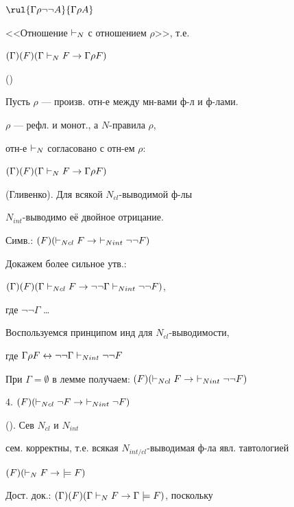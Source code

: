 \hspace*{5mm}$\rul{\Gamma\rr\neg\neg A}{\Gamma\rr A}$\ \par\vspace{3mm}
\par
<<Отношение $\vdash_{N}$  с отношением $\rho$>>, т.е.\par
\hspace*{20mm}$(\Gamma)(F)(\Gamma\vdash_{N} F\to\Gamma\rho F)$\par
{} ()\par
Пусть $\rho$ --- произв. отн-е между мн-вами ф-л и ф-лами.\par
{} $\rho$ --- рефл. и монот., а  $N$-правила  $\rho$,\par
{} отн-е $\vdash_{N}$ согласовано с отн-ем $\rho$:\par
\hspace*{20mm}$(\Gamma)(F)(\Gamma\vdash_{N} F\to\Gamma\rho F)$\par
{} (Гливенко). Для всякой $N_{cl}$-выводимой ф-лы\par
$N_{int}$-выводимо её двойное отрицание.\par
Симв.: \hspace{10mm}$(F)(\ncl F\to\ \nint\neg\neg F)$\par
Докажем более сильное утв.:\par
{} $(\Gamma)(F)(\Gamma\vdash_{Ncl} F\to\neg\neg\Gamma\vdash_{Nint}\neg\neg F)$,\par
где $\neg\neg\Gamma$ \dots\par
Воспользуемся принципом инд для $N_{cl}$-выводимости,\par
где $\Gamma\rho F\leftrightarrow\neg\neg\Gamma\vdash_{Nint}\neg\neg F$\par
\dvo При $\Gamma=\emptyset$ в лемме получаем: $(F)(\ncl F\to\ \nint\neg\neg F)$\par
4.  $(F)(\vdash_{Ncl}\neg F\to\ \vdash_{Nint}\neg F)$\par
{}\par
{} (). Сев $N_{cl}$ и $N_{int}$\par
сем. корректны, т.е. всякая $N_{int/cl}$-выводимая ф-ла явл. тавтологией\par
\hspace*{20mm}$(F)(\vdash_{N} F\to\ \models F)$\par
Дост. док.: $(\Gamma)(F)(\Gamma\vdash_{N} F\to\Gamma\models F)$, поскольку\par
